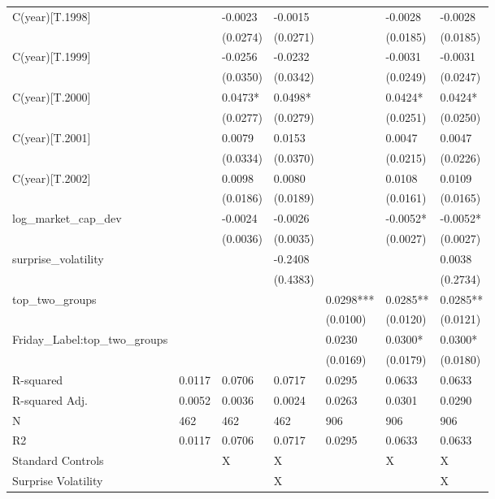\begin{tabular}{lllllll}
C(year)[T.1998] &  & -0.0023 & -0.0015 &  & -0.0028 & -0.0028 \\
 &  & (0.0274) & (0.0271) &  & (0.0185) & (0.0185) \\
C(year)[T.1999] &  & -0.0256 & -0.0232 &  & -0.0031 & -0.0031 \\
 &  & (0.0350) & (0.0342) &  & (0.0249) & (0.0247) \\
C(year)[T.2000] &  & 0.0473* & 0.0498* &  & 0.0424* & 0.0424* \\
 &  & (0.0277) & (0.0279) &  & (0.0251) & (0.0250) \\
C(year)[T.2001] &  & 0.0079 & 0.0153 &  & 0.0047 & 0.0047 \\
 &  & (0.0334) & (0.0370) &  & (0.0215) & (0.0226) \\
C(year)[T.2002] &  & 0.0098 & 0.0080 &  & 0.0108 & 0.0109 \\
 &  & (0.0186) & (0.0189) &  & (0.0161) & (0.0165) \\
log_market_cap_dev &  & -0.0024 & -0.0026 &  & -0.0052* & -0.0052* \\
 &  & (0.0036) & (0.0035) &  & (0.0027) & (0.0027) \\
surprise_volatility &  &  & -0.2408 &  &  & 0.0038 \\
 &  &  & (0.4383) &  &  & (0.2734) \\
top_two_groups &  &  &  & 0.0298*** & 0.0285** & 0.0285** \\
 &  &  &  & (0.0100) & (0.0120) & (0.0121) \\
Friday_Label:top_two_groups &  &  &  & 0.0230 & 0.0300* & 0.0300* \\
 &  &  &  & (0.0169) & (0.0179) & (0.0180) \\
R-squared & 0.0117 & 0.0706 & 0.0717 & 0.0295 & 0.0633 & 0.0633 \\
R-squared Adj. & 0.0052 & 0.0036 & 0.0024 & 0.0263 & 0.0301 & 0.0290 \\
N & 462 & 462 & 462 & 906 & 906 & 906 \\
R2 & 0.0117 & 0.0706 & 0.0717 & 0.0295 & 0.0633 & 0.0633 \\
Standard Controls &  & X & X &  & X & X \\
Surprise Volatility &  &  & X &  &  & X \\
\bottomrule
\end{tabular}

